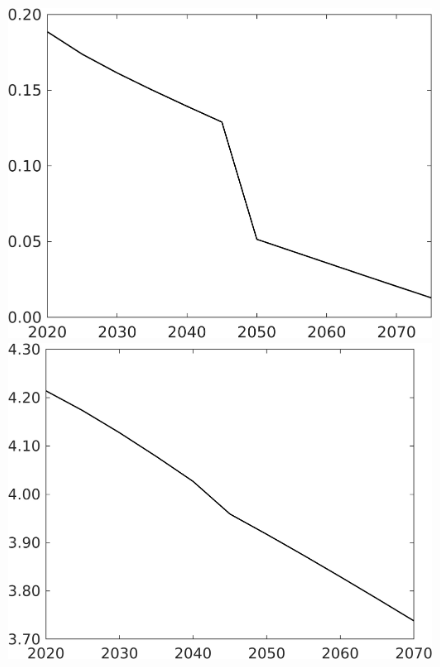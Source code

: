\documentclass[12pt]{article}
\begin{document}
\begin{figure}[h!!]
\begin{minipage}[]{0.32\textwidth}
\end{minipage}
\begin{minipage}[]{0.32\textwidth}
	\includegraphics[width=1\textwidth]{../../codding_model/own_basedOnFried/optimalPol_010922_revision/figures/all_13Sept22/CompTaufPER_bytaul_Reg0_sn_spillover0_nsk0_xgr0_knspil0_sep1_LFlimit1_emsbase0_countec0_GovRev0_etaa0.79_lgd0.png}
\end{minipage}		
\begin{minipage}[]{0.32\textwidth}
\includegraphics[width=1\textwidth]{../../codding_model/own_basedOnFried/optimalPol_010922_revision/figures/all_13Sept22/CompTaufPER_bytaul_Reg0_gAf_spillover0_nsk0_xgr0_knspil0_sep1_LFlimit1_emsbase0_countec0_GovRev0_etaa0.79_lgd0.png}

\end{minipage}
\end{figure}
\end{document}
